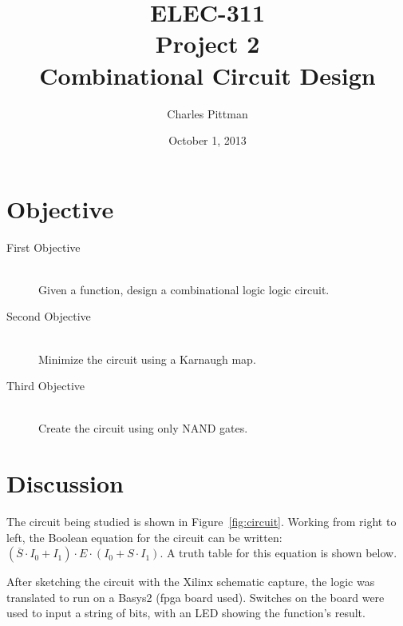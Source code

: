 \documentclass{article}
\author{Charles Pittman}
\title{ELEC-311\\ Project 2\\ Combinational Circuit Design}
\date{October 1, 2013}
\begin{document}
\maketitle %

\pagebreak


\renewcommand{\labelenumi}{\alph{enumi}.}

\section{Objective}
\label{sec:objective}

 \begin{description}
 \item[First Objective] \hfill \\
   Given a function, design a combinational logic logic circuit.
 \item[Second Objective] \hfill \\
   Minimize the circuit using a Karnaugh map.
 \item[Third Objective] \hfill \\
   Create the circuit using only NAND gates.
 \end{description}

\section{Discussion}
\label{sec:procedure}

The circuit being studied is shown in Figure~\ref{fig:circuit}.
Working from right to left, the Boolean equation for the circuit can
be written: $(\overline{S} \cdot I_0 + I_1) \cdot E \cdot (I_0 + S
\cdot I_1)$.  A truth table for this equation is shown below.

After sketching the circuit with the Xilinx schematic capture, the
logic was translated to run on a Basys2 (\gls{fpga} board used).
Switches on the board were used to input a string of bits, with an LED
showing the function's result.

\end{document}
